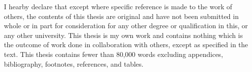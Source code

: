 
\begin{declaration}
I hearby declare that except where specific reference is made to the work of others, the contents of this thesis are original and have not been submitted in whole or in part for consideration for any other degree or qualification in this, or any other university. This thesis is my own work and contains nothing which is the outcome of work done in collaboration with others, except as specified in the text. This thesis contains fewer than 80,000 words excluding appendices, bibliography, footnotes, references, and tables.


\end{declaration}

